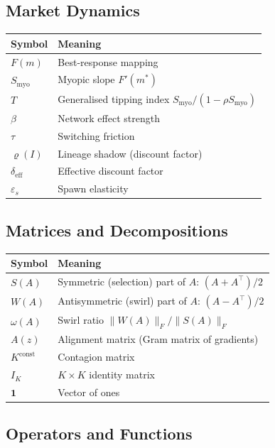 \documentclass[12pt]{article}
\begin{document}
\subsection{Market Dynamics}

\begin{tabular}{ll}
\toprule
\textbf{Symbol} & \textbf{Meaning} \\
\midrule
$F(m)$ & Best-response mapping \\
$S_{\text{myo}}$ & Myopic slope $F'(m^*)$ \\
$T$ & Generalised tipping index $S_{\text{myo}} / (1 - \rho S_{\text{myo}})$ \\
$\beta$ & Network effect strength \\
$\tau$ & Switching friction \\
$\varrho(I)$ & Lineage shadow (discount factor) \\
$\delta_{\text{eff}}$ & Effective discount factor \\
$\varepsilon_s$ & Spawn elasticity \\
\bottomrule
\end{tabular}

\subsection{Matrices and Decompositions}

\begin{tabular}{ll}
\toprule
\textbf{Symbol} & \textbf{Meaning} \\
\midrule
$S(A)$ & Symmetric (selection) part of $A$: $(A + A^\top)/2$ \\
$W(A)$ & Antisymmetric (swirl) part of $A$: $(A - A^\top)/2$ \\
$\omega(A)$ & Swirl ratio $\|W(A)\|_F / \|S(A)\|_F$ \\
$A(z)$ & Alignment matrix (Gram matrix of gradients) \\
$K^{\text{const}}$ & Contagion matrix \\
$I_K$ & $K \times K$ identity matrix \\
$\mathbf{1}$ & Vector of ones \\
\bottomrule
\end{tabular}

\subsection{Operators and Functions}
\end{document}
